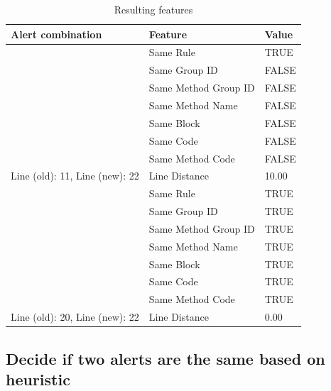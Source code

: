 \documentclass[
]{article}
\begin{document}
\begin{table}[H]

\caption{\label{tab:unnamed-chunk-13}Resulting features\label{table_features} }
\centering
\begin{tabular}[t]{l|l|l}
\hline
Alert combination & Feature & Value\\
\hline
\rowcolor{gray!6}  \rowcolor{gray!6}   & Same Rule & TRUE\\

 & Same Group ID & FALSE\\

\rowcolor{gray!6}   & Same Method Group ID & FALSE\\

 & Same Method Name & FALSE\\

\rowcolor{gray!6}   & Same Block & FALSE\\

 & Same Code & FALSE\\

\rowcolor{gray!6}   & Same Method Code & FALSE\\

\multirow[t]{-8}{*}{\raggedright\arraybackslash Line (old): 11, Line (new): 22} & Line Distance & 10.00\\
\cline{1-3}
 & Same Rule & TRUE\\

 & Same Group ID & TRUE\\

\rowcolor{gray!6}   & Same Method Group ID & TRUE\\

 & Same Method Name & TRUE\\

\rowcolor{gray!6}   & Same Block & TRUE\\

 & Same Code & TRUE\\

\rowcolor{gray!6}   & Same Method Code & TRUE\\

\multirow[t]{-8}{*}{\raggedright\arraybackslash Line (old): 20, Line (new): 22} & Line Distance & 0.00\\
\hline
\end{tabular}
\end{table}

\normalsize

\subsection{Decide if two alerts are the same based on heuristic}\label{heuristic}
\end{document}
